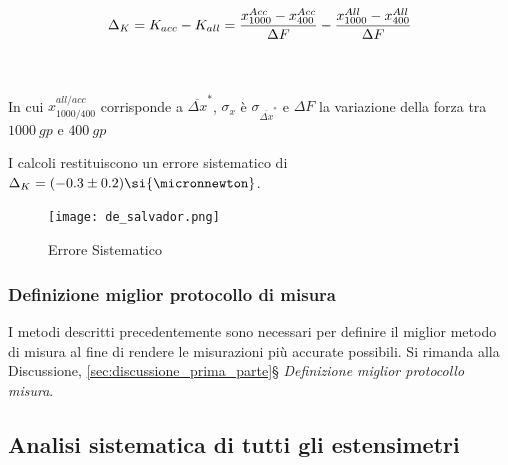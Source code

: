 \documentclass[a4paper,11pt,oneside]{article}
\begin{document}
\begin{equation*}
    \Delta_{K} = K_{acc}- K_{all}=\frac{x^{Acc}_{1000}-x^{Acc}_{400}}{\Delta F}-\frac{x^{All}_{1000}-x^{All}_{400}}{\Delta F} \\
\end{equation*}
    
\\
\\
In cui $x_{1000 / 400}^{all / acc}$ corrisponde a $\overline{\Delta x}^\ast$, $\sigma_{x}$ è $\sigma_{\overline{\Delta x}^\ast}$ e $\Delta F$ la variazione della forza tra $\SI{1000}{gp}$ e $\SI{400}{gp}$

I calcoli restituiscono un errore sistematico di $\Delta_{K} = (-0.3 \pm 0.2) \si{\micronnewton}$. 

\begin{figure}[h!]
    \centering
    \texttt{[image: de\_salvador.png]}
    \caption{Errore Sistematico}
    \label{fig:de_salvador}
\end{figure}

\subsubsection*{Definizione miglior protocollo di misura}
I metodi descritti precedentemente sono necessari per definire il miglior metodo di misura al fine di rendere le misurazioni più accurate possibili.
Si rimanda alla Discussione, \ref{sec:discussione_prima_parte}\S \textit{ Definizione miglior protocollo misura}. 


\newpage
\subsection{Analisi sistematica di tutti gli estensimetri}
\end{document}
